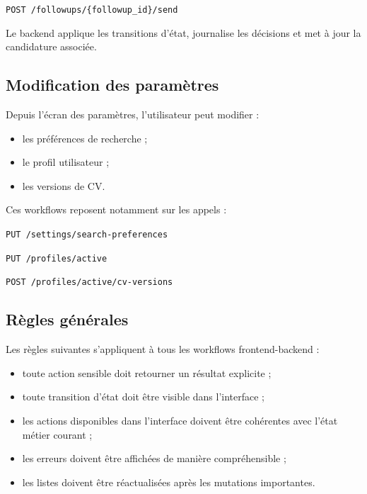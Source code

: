 \documentclass[11pt,a4paper]{article}
\begin{document}
\begin{center}
\texttt{POST /followups/\{followup\_id\}/send}
\end{center}

Le backend applique les transitions d’état, journalise les décisions et met à jour la candidature associée.

\subsection{Modification des paramètres}

Depuis l’écran des paramètres, l’utilisateur peut modifier :

\begin{itemize}
    \item les préférences de recherche ;
    \item le profil utilisateur ;
    \item les versions de CV.
\end{itemize}

Ces workflows reposent notamment sur les appels :

\begin{center}
\texttt{PUT /settings/search-preferences}
\end{center}

\begin{center}
\texttt{PUT /profiles/active}
\end{center}

\begin{center}
\texttt{POST /profiles/active/cv-versions}
\end{center}

\subsection{Règles générales}

Les règles suivantes s’appliquent à tous les workflows frontend-backend :

\begin{itemize}
    \item toute action sensible doit retourner un résultat explicite ;
    \item toute transition d’état doit être visible dans l’interface ;
    \item les actions disponibles dans l’interface doivent être cohérentes avec l’état métier courant ;
    \item les erreurs doivent être affichées de manière compréhensible ;
    \item les listes doivent être réactualisées après les mutations importantes.
\end{itemize}
\end{document}
